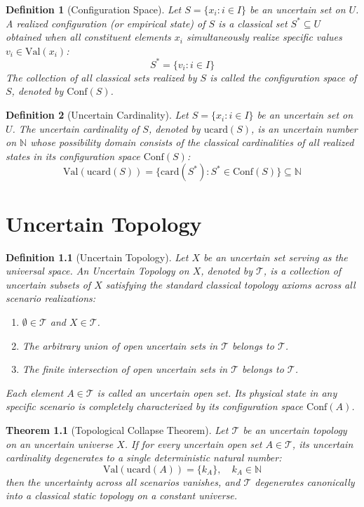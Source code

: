 \documentclass[a4paper,14pt, twoside]{memoir}
\newtheorem{definition}{Definition}[chapter]
\newtheorem{theorem}{Theorem}[chapter]
\begin{document}
\begin{definition}[Configuration Space]
	Let $S = \{x_i : i \in I\}$ be an uncertain set on $U$. A realized configuration (or empirical state) of $S$ is a classical set $S^* \subseteq U$ obtained when all constituent elements $x_i$ simultaneously realize specific values $v_i \in \mathrm{Val}(x_i)$:
	\[
		S^* = \{v_i : i \in I\}
	\]
	The collection of all classical sets realized by $S$ is called the configuration space of $S$, denoted by $\mathrm{Conf}(S)$.
\end{definition}

\begin{definition}[Uncertain Cardinality]
	Let $S = \{x_i : i \in I\}$ be an uncertain set on $U$. The uncertain cardinality of $S$, denoted by $\mathrm{ucard}(S)$, is an uncertain number on $\mathbb{N}$ whose possibility domain consists of the classical cardinalities of all realized states in its configuration space $\mathrm{Conf}(S)$:
	\[
		\mathrm{Val}(\mathrm{ucard}(S)) = \{ \mathrm{card}(S^*) : S^* \in \mathrm{Conf}(S) \} \subseteq \mathbb{N}
	\]
\end{definition}

\chapter{Uncertain Topology}

\begin{definition}[Uncertain Topology]
	Let $X$ be an uncertain set serving as the universal space. An \emph{Uncertain Topology} on $X$, denoted by $\mathcal{T}$, is a collection of uncertain subsets of $X$ satisfying the standard classical topology axioms across all scenario realizations:
	\begin{enumerate}[label=\roman*)]
		\item $\emptyset \in \mathcal{T}$ and $X \in \mathcal{T}$.
		\item The arbitrary union of open uncertain sets in $\mathcal{T}$ belongs to $\mathcal{T}$.
		\item The finite intersection of open uncertain sets in $\mathcal{T}$ belongs to $\mathcal{T}$.
	\end{enumerate}
	Each element $A \in \mathcal{T}$ is called an \emph{uncertain open set}. Its physical state in any specific scenario is completely characterized by its configuration space $\mathrm{Conf}(A)$.
\end{definition}

\begin{theorem}[Topological Collapse Theorem]
	Let $\mathcal{T}$ be an uncertain topology on an uncertain universe $X$. If for every uncertain open set $A \in \mathcal{T}$, its uncertain cardinality degenerates to a single deterministic natural number:
	\[
		\mathrm{Val}(\mathrm{ucard}(A)) = \{k_A\}, \quad k_A \in \mathbb{N}
	\]
	then the uncertainty across all scenarios vanishes, and $\mathcal{T}$ degenerates canonically into a classical static topology on a constant universe.
\end{theorem}
\end{document}
